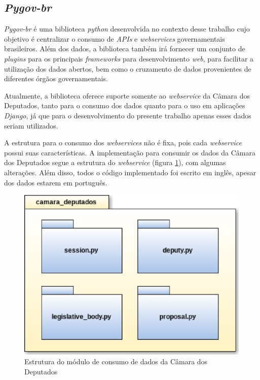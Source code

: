 \subsection{\textit{Pygov-br}}

\textit{Pygov-br} é uma biblioteca \textit{python} desenvolvida no contexto desse trabalho cujo objetivo é centralizar o consumo de \textit{APIs} e \textit{webservices} governamentais brasileiros. Além dos dados, a biblioteca também irá fornecer um conjunto de \textit{plugins} para os principais \textit{frameworks} para desenvolvimento \textit{web}, para facilitar a utilização dos dados abertos, bem como o cruzamento de dados provenientes de diferentes órgãos governamentais.

Atualmente, a biblioteca oferece suporte somente ao \textit{webservice} da Câmara dos Deputados, tanto para o consumo dos dados quanto para o uso em aplicações \textit{Django}, já que para o desenvolvimento do presente trabalho apenas esses dados seriam utilizados.

A estrutura para o consumo dos \textit{webservices} não é fixa, pois cada \textit{webservice} possui suas características. A implementação para consumir os dados da Câmara dos Deputados segue a estrutura do \textit{webservice} (figura \ref{estrutua_camara_deputados}), com algumas alterações. Além disso, todos o código implementado foi escrito em inglês, apesar dos dados estarem em português.

\begin{figure}[h]
    \centering
    \includegraphics[scale=0.5]{figuras/camara_deputados.eps}
    \caption{Estrutura do módulo de consumo de dados da Câmara dos Deputados}
    \label{estrutua_camara_deputados}
\end{figure}


